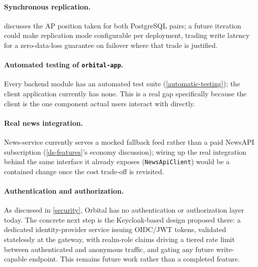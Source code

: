 \documentclass{scrartcl}
\begin{document}
\paragraph{Synchronous replication.}  discusses the AP position taken
for both PostgreSQL pairs; a future iteration could make replication mode configurable per
deployment, trading write latency for a zero-data-loss guarantee on failover where that trade is
justified.

\paragraph{Automated testing of \texttt{orbital-app}.} Every backend module has an automated test
suite (\cref{automatic-testing}); the client application currently has none. This is a real gap
specifically because the client is the one component actual users interact with directly.

\paragraph{Real news integration.} News-service currently serves a mocked fallback feed rather
than a paid NewsAPI subscription (\cref{ds-features}'s economy discussion); wiring up the real
integration behind the same interface it already exposes (\texttt{NewsApiClient}) would be a
contained change once the cost trade-off is revisited.

\paragraph{Authentication and authorization.} As discussed in \cref{security}, Orbital has no
authentication or authorization layer today. The concrete next step is the Keycloak-based design
proposed there: a dedicated identity-provider service issuing OIDC/JWT tokens, validated
statelessly at the gateway, with realm-role claims driving a tiered rate limit between
authenticated and anonymous traffic, and gating any future write-capable endpoint. This remains
future work rather than a completed feature.



\end{document}
